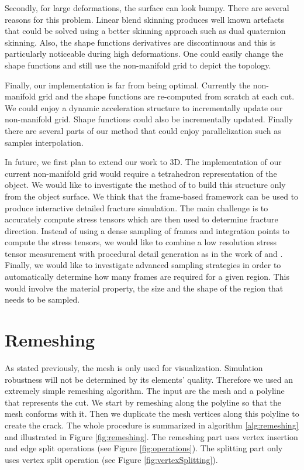 \documentclass[11pt, oneside, a4paper]{memoir}
\begin{document}
Secondly, for large deformations, the surface can look bumpy. There are several reasons for this problem. Linear blend skinning produces well known artefacts that could be solved using a better skinning approach such as dual quaternion skinning. Also, the shape functions derivatives are discontinuous and this is particularly noticeable during high deformations. One could easily change the shape functions and still use the non-manifold grid to depict the topology.

Finally, our implementation is far from being optimal. Currently the non-manifold grid and the shape functions are re-computed from scratch at each cut. We could enjoy a dynamic acceleration structure to incrementally update our non-manifold grid. Shape functions could also be incrementally updated. Finally there are several parts of our method that could enjoy parallelization such as samples interpolation.

In future, we first plan to extend our work to 3D. The implementation of our current non-manifold grid would require a tetrahedron representation of the object. We would like to investigate the method of \cite{Remillard2013} to build this structure only from the object surface. We think that the frame-based framework can be used to produce interactive detailed fracture simulation. The main challenge is to accurately compute stress tensors which are then used to determine fracture direction. Instead of using a dense sampling of frames and integration points to compute the stress tensors, we would like to combine a low resolution stress tensor measurement with procedural detail generation as in the work of \cite{Chen2014} and \cite{Lejemble2015}. Finally, we would like to investigate advanced sampling strategies in order to automatically determine how many frames are required for a given region. This would involve the material property, the size and the shape of the region that needs to be sampled.

\section{Remeshing} \label{appendix:remeshing}

As stated previously, the mesh is only used for visualization. Simulation robustness will not be determined by its elements' quality. Therefore we used an extremely simple remeshing algorithm. The input are the mesh and a polyline that represents the cut. We start by remeshing along the polyline so that the mesh  conforms with it. Then we duplicate the mesh vertices along this polyline to create the crack. The whole procedure is summarized in algorithm \ref{alg:remeshing} and illustrated in Figure \ref{fig:remeshing}. The remeshing part uses vertex insertion and edge split operations (see Figure \ref{fig:operations}). The splitting part only uses vertex split operation (see Figure \ref{fig:vertexSplitting}).
\end{document}

